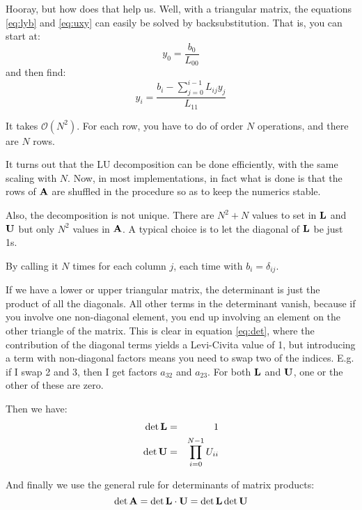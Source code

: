 Hooray, but how does that help us. Well, with a triangular matrix, the
equations \ref{eq:lyb} and \ref{eq:uxy} can easily be solved by
backsubstitution.  That is, you can start at:
\begin{equation}
y_0 = \frac{b_0}{L_{00}}
\end{equation}
and then find:
\begin{equation}
y_i = \frac{b_i - \sum_{j=0}^{i-1} L_{ij} y_j}{L_{11}}
\end{equation}


\begin{answer}
It takes $\mathcal{O}(N^2)$. For each row, you have to do of order $N$
operations, and there are $N$ rows. 
\end{answer}

It turns out that the LU decomposition can be done efficiently, with
the same scaling with $N$. Now, in most implementations, in fact what
is done is that the rows of ${\bf A}$ are shuffled in the procedure so
as to keep the numerics stable.

Also, the decomposition is not unique. There are $N^2 + N$ values to
set in ${\bf L}$ and ${\bf U}$ but only $N^2$ values in ${\bf A}$. A
typical choice is to let the diagonal of ${\bf L}$ be just 1s. 


\begin{answer}
By calling it $N$ times for each column $j$, each time with $b_i =
\delta_{ij}$. 
\end{answer}


\begin{answer}
If we have a lower or upper triangular matrix, the determinant is just
the product of all the diagonals. All other terms in the determinant
vanish, because if you involve one non-diagonal element, you end up
involving an element on the other triangle of the matrix. This is
clear in equation \ref{eq:det}, where the contribution of the diagonal
terms yields a Levi-Civita value of 1, but introducing a term with
non-diagonal factors means you need to swap two of the
indices. E.g. if I swap 2 and 3, then I get factors $a_{32}$ and
$a_{23}$. For both ${\bf L}$ and ${\bf U}$, one or the other of these
are zero.

Then we have:
\begin{eqnarray}
\det {\bf L} &=& 1 \cr
\det {\bf U} &=& \prod_{i=0}^{N-1} U_{ii}
\end{eqnarray}

And finally we use the general rule for determinants of matrix
products:
\begin{equation}
\det {\bf A} =  \det {\bf L}  \cdot {\bf U} = 
\det {\bf L} \det {\bf U}
\end{equation}
\end{answer}


